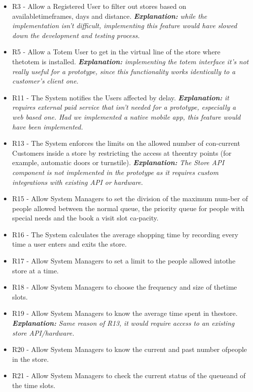 \documentclass[
]{article}
\begin{document}
\begin{itemize}
\item
  R3 - Allow a Registered User to filter out stores based on
  availabletimeframes, days and distance. \emph{\textbf{Explanation:}
  while the implementation isn't difficult, implementing this feature
  would have slowed down the development and testing process.}
\item
  R5 - Allow a Totem User to get in the virtual line of the store where
  thetotem is installed. \emph{\textbf{Explanation:} implementing the
  totem interface it's not really useful for a prototype, since this
  functionality works identically to a customer's client one.}
\item
  R11 - The System notifies the Users affected by delay.
  \emph{\textbf{Explanation:} it requires external paid service that
  isn't needed for a prototype, especially a web based one. Had we
  implemented a native mobile app, this feature would have been
  implemented.}
\item
  R13 - The System enforces the limits on the allowed number of
  con-current Customers inside a store by restricting the access at
  theentry points (for example, automatic doors or turnstile).
  \emph{\textbf{Explanation:} The Store API component is not implemented
  in the prototype as it requires custom integrations with existing API
  or hardware.}
\item
  R15 - Allow System Managers to set the division of the maximum num-ber
  of people allowed between the normal queue, the priority queue for
  people with special needs and the book a visit slot ca-pacity.
\item
  R16 - The System calculates the average shopping time by recording
  every time a user enters and exits the store.
\item
  R17 - Allow System Managers to set a limit to the people allowed
  intothe store at a time.
\item
  R18 - Allow System Managers to choose the frequency and size of
  thetime slots.
\item
  R19 - Allow System Managers to know the average time spent in
  thestore. \emph{\textbf{Explanation:} Same reason of R13, it would
  require access to an existing store API/hardware.}
\item
  R20 - Allow System Managers to know the current and past number
  ofpeople in the store.
\item
  R21 - Allow System Managers to check the current status of the
  queueand of the time slots.

\end{itemize}
\end{document}
